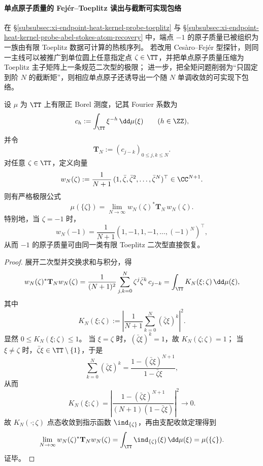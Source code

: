 \paragraph{单点原子质量的 Fej\'er--Toeplitz 读出与截断可实现包络}
在 \S\ref{subsubsec:xi-endpoint-heat-kernel-probe-toeplitz} 与 \S\ref{subsubsec:xi-endpoint-heat-kernel-probe-abel-stokes-atom-recovery} 中，端点 \(-1\) 的原子质量已被组织为一族由有限 Toeplitz 数据可计算的热核序列。
若改用 Ces\`aro--Fej\'er 型探针，则同一主线可以被推广到单位圆上任意指定点 \(\zeta\in\TT\)，并把单点原子质量压缩为 Toeplitz 主子矩阵上一条规范二次型的极限；
进一步，把全矩问题削弱为“只固定到阶 \(N\) 的截断矩”，则相应单点原子还诱导出一个随 \(N\) 单调收敛的可实现下包络。

\begin{theorem}\label{thm:xi-point-atom-fejer-toeplitz-limit}
设 \(\mu\) 为 \(\TT\) 上有限正 Borel 测度，记其 Fourier 系数为
\[
c_h:=\int_{\TT}\xi^{-h}\,\dd\mu(\xi)\qquad(h\in\ZZ),
\]
并令
\[
\mathbf T_N:=(c_{j-k})_{0\le j,k\le N}.
\]
对任意 \(\zeta\in\TT\)，定义向量
\[
w_N(\zeta):=\frac{1}{N+1}\,(1,\bar\zeta,\bar\zeta^2,\dots,\bar\zeta^N)^\top\in\CC^{N+1}.
\]
则有严格极限公式
\[
\boxed{\;
\mu(\{\zeta\})=\lim_{N\to\infty}w_N(\zeta)^\ast \mathbf T_N\,w_N(\zeta).\;}
\]
特别地，当 \(\zeta=-1\) 时，
\[
w_N(-1)=\frac{1}{N+1}(1,-1,1,-1,\dots,(-1)^N)^\top,
\]
从而 \(-1\) 的原子质量可由同一类有限 Toeplitz 二次型直接恢复。
\end{theorem}

\begin{proof}
展开二次型并交换求和与积分，得
\[
w_N(\zeta)^\ast \mathbf T_N w_N(\zeta)
=\frac{1}{(N+1)^2}\sum_{j,k=0}^{N}\zeta^j\bar\zeta^k\,c_{j-k}
=\int_{\TT}K_N(\xi;\zeta)\,\dd\mu(\xi),
\]
其中
\[
K_N(\xi;\zeta):=
\left|
\frac{1}{N+1}\sum_{k=0}^{N}(\bar\zeta\xi)^k
\right|^2.
\]
显然 \(0\le K_N(\xi;\zeta)\le 1\)。
当 \(\xi=\zeta\) 时，\((\bar\zeta\xi)^k=1\)，故 \(K_N(\zeta;\zeta)=1\)；
当 \(\xi\neq \zeta\) 时，\(\bar\zeta\xi\in\TT\setminus\{1\}\)，于是
\[
\sum_{k=0}^{N}(\bar\zeta\xi)^k
=\frac{1-(\bar\zeta\xi)^{N+1}}{1-\bar\zeta\xi},
\]
从而
\[
K_N(\xi;\zeta)
=
\left|
\frac{1-(\bar\zeta\xi)^{N+1}}{(N+1)(1-\bar\zeta\xi)}
\right|^2
\longrightarrow 0.
\]
故 \(K_N(\cdot;\zeta)\) 点态收敛到指示函数 \(\ind_{\{\zeta\}}\)，再由支配收敛定理得到
\[
\lim_{N\to\infty}w_N(\zeta)^\ast \mathbf T_N w_N(\zeta)
=\int_{\TT}\ind_{\{\zeta\}}(\xi)\,\dd\mu(\xi)
=\mu(\{\zeta\}).
\]
证毕。
\end{proof}

